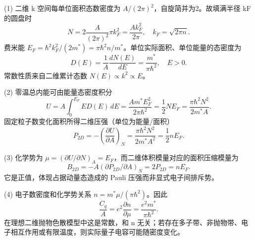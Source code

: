 (1) 二维 k 空间每单位面积态数密度为 \(A/(2\pi)^2\)，自旋简并为2。故填满半径 kF 的圆盘时
\[
N=2\frac A{(2\pi)^2}\pi k_F^2=\frac{Ak_F^2}{2\pi},\quad
k_F=\sqrt{2\pi n}.
\]
费米能 \(E_F=\hbar^2k_F^2/(2m^*)=\pi\hbar^2 n/m^*\)。单位实际面积、单位能量的态密度为
\[
D(E)=\frac1A\frac{dN(E)}{dE}
=\frac{m^*}{\pi\hbar^2},\quad E>0.
\]
常数性质来自二维累计态数 \(N(E)\propto k^2\propto E\)。

(2) 零温总内能可由能量态密度积分
\[
U=A\int_0^{E_F}E D(E)\,dE
=\frac{Am^*E_F^2}{2\pi\hbar^2}
=\frac12NE_F=\frac{\pi\hbar^2N^2}{2m^*A}.
\]
固定粒子数变化面积所得二维压强（单位为能量/面积）
\[
P_{\!2D}=-\left(\frac{\partial U}{\partial A}\right)_N
=\frac{\pi\hbar^2N^2}{2m^*A^2}=\frac12nE_F.
\]

(3) 化学势为 \(\mu=(\partial U/\partial N)_A=E_F\)，而二维体积模量对应的面积压缩模量为
\[
B_{\!2D}=-A(\partial P_{\!2D}/\partial A)_N
=2P_{\!2D}=nE_F.
\]
它是正值，体现占据动量态造成的 Pauli 压强而非显式电子间排斥势。

(4) 电子数密度和化学势关系 \(n=m^*\mu/(\pi\hbar^2)\)。因此
\[
\frac{C_q}{A}=e^2\frac{\partial n}{\partial\mu}
=\frac{e^2m^*}{\pi\hbar^2}.
\]
在理想二维抛物色散模型中这是常数，和 n 无关；若存在多子带、非抛物带、电子相互作用或有限温度，则实际量子电容可能随密度变化。
